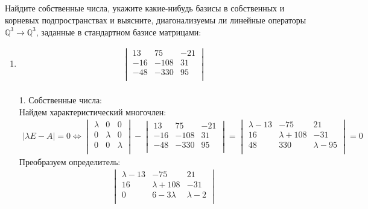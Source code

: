 		
		
		\subsection{}
		Найдите собственные числа, укажите какие-нибудь базисы в собственных и корневых подпространствах и выясните, диагонализуемы ли линейные операторы $\mathbb{Q}^{3} \to \mathbb{Q}^{3}$, заданные в стандартном базисе матрицами: 
		\begin{enumerate}
		\item	
			\begin{gather*}
				\begin{vmatrix}
					13 & 75 & -21\\
					-16 & -108 & 31\\
					-48 & -330 & 95\\
				\end{vmatrix}
			\end{gather*}
			\\
			1. Собственные числа:\\
			Найдем характеристический многочлен: 
			\begin{gather*}
				|\lambda E - A| = 0 \Leftrightarrow 
				\begin{vmatrix}
					\lambda & 0 & 0\\
					0 & \lambda & 0\\
					0 & 0 & \lambda\\
				\end{vmatrix}
				-
				\begin{vmatrix}
					13 & 75 & -21\\
					-16 & -108 & 31\\
					-48 & -330 & 95\\
				\end{vmatrix}
				=
				\begin{vmatrix}
					\lambda - 13 & -75 & 21\\
					16 & \lambda + 108 & -31\\
					48 & 330 & \lambda - 95\\
				\end{vmatrix}
				= 0 
			\end{gather*}
			Преобразуем определитель: 
			\begin{gather*}
				\begin{vmatrix}
					\lambda - 13 & -75 & 21\\
					16 & \lambda + 108 & -31\\
					0 & 6 - 3\lambda & \lambda - 2\\

\end{vmatrix}
\end{gather*}
\end{enumerate}
